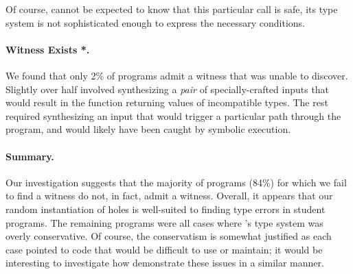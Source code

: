 Of course, \ocaml cannot be expected to know that this particular call
is safe, its type system is not sophisticated enough to express the
necessary conditions.
%


\paragraph{Witness Exists *.}
%
We found that only 2\% of programs admit a witness that \toolname
was unable to discover.
%
Slightly over half involved synthesizing a \emph{pair} of
specially-crafted inputs that would result in the function returning
values of incompatible types.
%
The rest required synthesizing an input that would trigger a
particular path through the program, and would likely have been caught
by symbolic execution.

\paragraph{Summary.}
%
Our investigation suggests that the majority of programs
(84\%) for which we fail to find a witness do not, in fact, admit a
witness.
%
Overall, it appears that our random instantiation of holes is well-suited
to finding type errors in student programs.
%
The remaining programs were all cases where \ocaml's type system was
overly conservative.
%
Of course, the conservatism is somewhat justified as each case pointed
to code that would be difficult to use or maintain;
%
it would be interesting to investigate how demonstrate these issues in a
similar manner.


